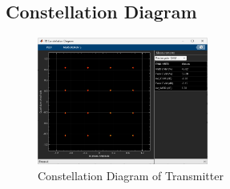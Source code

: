 \documentclass[11pt]{article}
\numberwithin{figure}{section}
\numberwithin{equation}{section}
\begin{document}
\subsection{Constellation Diagram}
\begin{figure}[!h]
    \centering
    \includegraphics[width=0.5\textwidth]{images/TX Constellation Diagram.png}
    \caption{Constellation Diagram of Transmitter}
    \label{fig:TXConstellation}
\end{figure}
\end{document}
